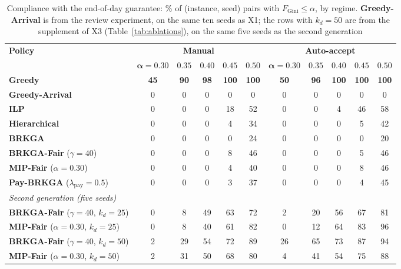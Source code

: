 \documentclass[a4paper,11pt,review,3p,authoryear]{elsarticle}
\newcommand{\FG}{F_{\text{Gini}}}
\begin{document}
\begin{table}[htbp]
\centering
\begin{adjustbox}{max width=\textwidth}
\begin{tabular}{l|ccccc|ccccc}
\hline
\multirow{2}{*}{\textbf{Policy}} & \multicolumn{5}{c|}{\textbf{Manual}} & \multicolumn{5}{c}{\textbf{Auto-accept}} \\
 & $\boldsymbol{\alpha = 0.30}$ & $\boldsymbol{0.35}$ & $\boldsymbol{0.40}$ & $\boldsymbol{0.45}$ & $\boldsymbol{0.50}$ & $\boldsymbol{\alpha = 0.30}$ & $\boldsymbol{0.35}$ & $\boldsymbol{0.40}$ & $\boldsymbol{0.45}$ & $\boldsymbol{0.50}$ \\
\hline
\textbf{Greedy} & \textbf{45} & \textbf{90} & \textbf{98} & \textbf{100} & \textbf{100} & \textbf{50} & \textbf{96} & \textbf{100} & \textbf{100} & \textbf{100} \\
\textbf{Greedy-Arrival} & 0 & 0 & 0 & 0 & 0 & 0 & 0 & 0 & 0 & 0 \\
\textbf{ILP} & 0 & 0 & 0 & 18 & 52 & 0 & 0 & 4 & 46 & 58 \\
\textbf{Hierarchical} & 0 & 0 & 0 & 4 & 34 & 0 & 0 & 0 & 5 & 42 \\
\textbf{BRKGA} & 0 & 0 & 0 & 0 & 24 & 0 & 0 & 0 & 0 & 20 \\
\hline
\textbf{BRKGA-Fair} ($\gamma = 40$) & 0 & 0 & 0 & 8 & 46 & 0 & 0 & 0 & 5 & 46 \\
\textbf{MIP-Fair} ($\alpha = 0.30$) & 0 & 0 & 0 & 4 & 40 & 0 & 0 & 0 & 8 & 46 \\
\textbf{Pay-BRKGA} ($\lambda_{\text{pay}} = 0.5$) & 0 & 0 & 0 & 3 & 37 & 0 & 0 & 0 & 4 & 45 \\
\hline
\multicolumn{11}{l}{\textit{Second generation (five seeds)}} \\
\textbf{BRKGA-Fair} ($\gamma = 40$, $k_d = 25$) & 0 & 8 & 49 & 63 & 72 & 2 & 20 & 56 & 67 & 81 \\
\textbf{MIP-Fair} ($\alpha = 0.30$, $k_d = 25$) & 0 & 8 & 40 & 61 & 82 & 0 & 12 & 64 & 83 & 96 \\
\textbf{BRKGA-Fair} ($\gamma = 40$, $k_d = 50$) & 2 & 29 & 54 & 72 & 89 & 26 & 65 & 73 & 87 & 94 \\
\textbf{MIP-Fair} ($\alpha = 0.30$, $k_d = 50$) & 2 & 31 & 50 & 68 & 80 & 4 & 41 & 54 & 75 & 88 \\
\hline
\end{tabular}
\end{adjustbox}
\caption{Compliance with the end-of-day guarantee: \% of (instance, seed) pairs with $\FG \le \alpha$, by regime. \textbf{Greedy-Arrival} is from the review experiment, on the same ten seeds as X1; the rows with $k_d = 50$ are from the supplement of X3 (Table~\ref{tab:ablations}), on the same five seeds as the second generation}
\label{tab:compliance}
\end{table}
\end{document}
